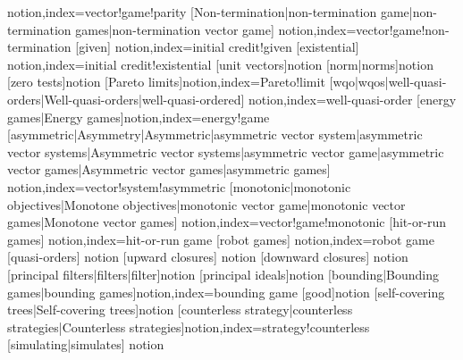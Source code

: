                    {notion,index={vector!game!parity}}
[Non-termination|non-termination
  game|non-termination games|non-termination vector game]
                    {notion,index={vector!game!non-termination}}
[given]
                    {notion,index={initial credit!given}}
[existential]
                    {notion,index={initial credit!existential}}
[unit vectors]{notion}
[norm|norms]{notion}
[zero tests]{notion}
[Pareto limits]{notion,index={Pareto!limit}}
[wqo|wqos|well-quasi-orders|Well-quasi-orders|well-quasi-ordered]
  {notion,index={well-quasi-order}}
[energy games|Energy
  games]{notion,index={energy!game}}
[asymmetric|Asymmetry|Asymmetric|asymmetric
vector system|asymmetric vector systems|Asymmetric vector
  systems|asymmetric vector game|asymmetric vector games|Asymmetric
  vector games|asymmetric games]
  {notion,index={vector!system!asymmetric}}
[monotonic|monotonic objectives|Monotone
  objectives|monotonic vector game|monotonic vector games|Monotone
  vector games]
  {notion,index={vector!game!monotonic}}
[hit-or-run games]
  {notion,index={hit-or-run game}}
[robot games]
  {notion,index={robot game}}
[quasi-orders]
  {notion}
[upward closures]
  {notion}
[downward closures]
  {notion}
[principal filters|filters|filter]{notion}
[principal ideals]{notion}
[bounding|Bounding games|bounding
games]{notion,index={bounding game}}
[good]{notion}
[self-covering trees|Self-covering trees]{notion}
[counterless strategy|counterless
  strategies|Counterless
  strategies]{notion,index={strategy!counterless}}
[simulating|simulates]
  {notion}
